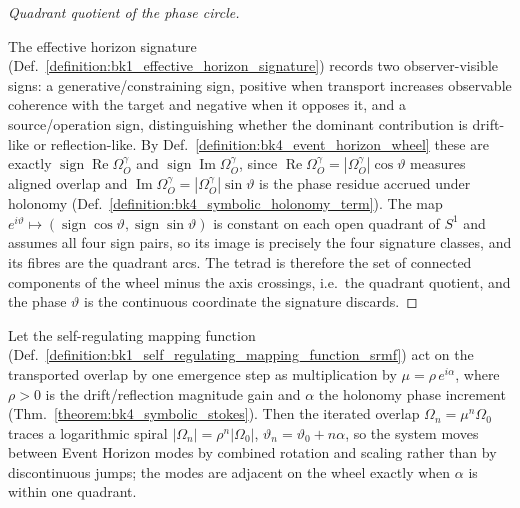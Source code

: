 \begin{proof}[Quadrant quotient of the phase circle]
\label{proof:bk4_wheel_refines_signature}
\leavevmode

The effective horizon signature
(Def.~\ref{definition:bk1_effective_horizon_signature}) records two observer-visible
signs: a generative/constraining sign, positive when transport increases
observable coherence with the target and negative when it opposes it, and a
source/operation sign, distinguishing whether the dominant contribution is
drift-like or reflection-like. By Def.~\ref{definition:bk4_event_horizon_wheel}
these are exactly $\operatorname{sign}\operatorname{Re}\Omega_O^\gamma$ and
$\operatorname{sign}\operatorname{Im}\Omega_O^\gamma$, since
$\operatorname{Re}\Omega_O^\gamma=|\Omega_O^\gamma|\cos\vartheta$ measures aligned
overlap and $\operatorname{Im}\Omega_O^\gamma=|\Omega_O^\gamma|\sin\vartheta$ is the
phase residue accrued under holonomy
(Def.~\ref{definition:bk4_symbolic_holonomy_term}). The map
$e^{i\vartheta}\mapsto(\operatorname{sign}\cos\vartheta,\operatorname{sign}\sin\vartheta)$
is constant on each open quadrant of $S^1$ and assumes all four sign pairs, so its
image is precisely the four signature classes, and its fibres are the quadrant
arcs. The tetrad is therefore the set of connected components of the wheel minus the
axis crossings, i.e.\ the quadrant quotient, and the phase $\vartheta$ is the
continuous coordinate the signature discards.
\end{proof}

\begin{proposition}
\label{proposition:bk4_spiral_transition}
Let the self-regulating mapping function
(Def.~\ref{definition:bk1_self_regulating_mapping_function_srmf}) act on the
transported overlap by one emergence step as multiplication by
$\mu=\rho\,e^{i\alpha}$, where $\rho>0$ is the drift/reflection magnitude gain and
$\alpha$ the holonomy phase increment (Thm.~\ref{theorem:bk4_symbolic_stokes}). Then
the iterated overlap $\Omega_n=\mu^{n}\Omega_0$ traces a logarithmic spiral
$|\Omega_n|=\rho^{n}|\Omega_0|$, $\vartheta_n=\vartheta_0+n\alpha$, so the system
moves between Event Horizon modes by combined rotation and scaling rather than by
discontinuous jumps; the modes are adjacent on the wheel exactly when $\alpha$ is
within one quadrant.
\end{proposition}

